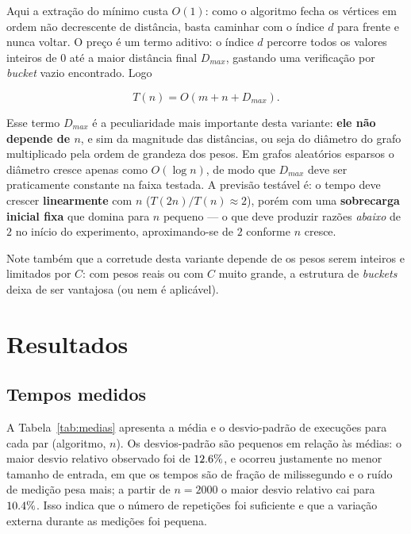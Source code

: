 \documentclass[12pt,a4paper]{article}
\begin{document}
Aqui a extração do mínimo custa $O(1)$: como o algoritmo fecha os vértices em
ordem não decrescente de distância, basta caminhar com o índice $d$ para
frente e nunca voltar. O preço é um termo aditivo: o índice $d$ percorre todos
os valores inteiros de $0$ até a maior distância final $D_{max}$, gastando uma
verificação por \emph{bucket} vazio encontrado. Logo

\[
T(n) = O(m + n + D_{max}).
\]

Esse termo $D_{max}$ é a peculiaridade mais importante desta variante:
\textbf{ele não depende de $n$}, e sim da magnitude das distâncias, ou seja do
diâmetro do grafo multiplicado pela ordem de grandeza dos pesos. Em grafos
aleatórios esparsos o diâmetro cresce apenas como $O(\log n)$, de modo que
$D_{max}$ deve ser praticamente constante na faixa testada. A previsão
testável é: o tempo deve crescer \textbf{linearmente} com $n$
($T(2n)/T(n) \approx 2$), porém com uma \textbf{sobrecarga inicial fixa} que
domina para $n$ pequeno --- o que deve produzir razões \emph{abaixo} de $2$ no
início do experimento, aproximando-se de $2$ conforme $n$ cresce.

Note também que a corretude desta variante depende de os pesos serem inteiros
e limitados por $C$: com pesos reais ou com $C$ muito grande, a estrutura de
\emph{buckets} deixa de ser vantajosa (ou nem é aplicável).

\section{Resultados}

\subsection{Tempos medidos}

A Tabela~\ref{tab:medias} apresenta a média e o desvio-padrão de
\numRepeticoes{} execuções para cada par (algoritmo, $n$). Os desvios-padrão
são pequenos em relação às médias: o maior desvio relativo observado foi de
$12.6{}\%$, e ocorreu justamente no menor tamanho de entrada, em que
os tempos são de fração de milissegundo e o ruído de medição pesa mais; a
partir de $n = 2000$ o maior desvio relativo cai para $10.4{}\%$.
Isso indica que o número de repetições foi suficiente e que a variação externa
durante as medições foi pequena.
\end{document}
